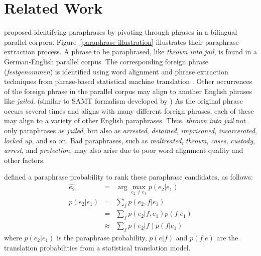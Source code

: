 \documentclass[11pt]{article}
\begin{document}
\section{Related Work}

  proposed identifying paraphrases by pivoting through phrases in a bilingual parallel corpora. 
Figure~\ref{paraphrase-illustration} illustrates their paraphrase extraction process. A phrase to be paraphrased, like {\it thrown into jail}, is found in a German-English parallel corpus.  The corresponding foreign phrase ({\it festgenommen}) is identified using word alignment and phrase extraction techniques from phrase-based statistical machine translation \cite{KoehnEtAl03}.  Other occurrences of the foreign phrase in the parallel corpus may align to another English phrases like {\it jailed}.  (similar to SAMT formalism developed by  )%
%
As the original phrase occurs several times and aligns with many different foreign phrases, each of these may align to a variety of other English paraphrases.  Thus, {\it thrown into jail} not only paraphrases as {\it jailed}, but also as {\it arrested}, {\it detained}, {\it imprisoned}, {\it incarcerated}, {\it locked up}, and so on.
Bad paraphrases, such as
 {\it maltreated}, {\it thrown}, {\it cases}, {\it custody}, {\it arrest}, and {\it protection}, may also arise due to poor word alignment quality and other factors.

 defined a paraphrase probability to rank these paraphrase candidates,  as follows:
\begin{eqnarray} \label{paraphrase-prob-1}
 \hat{e_2}	& = & \arg \max_{e_2 \neq e_1} p(e_2 | e_1)\label{paraphrase-prob}  \\
  p(e_2|e_1) &=& \sum_f p(e_2,f|e_1)\\
                  &=& \sum_f p(e_2|f,e_1) p(f|e_1) \\
                  &\approx& \sum_f p(e_2|f) p(f|e_1)
\label{paraphrase_prob_eqn}
\end{eqnarray}
where ${p(e_2|e_1)}$ is the paraphrase probability, ${p(e|f)}$ and ${p(f|e)}$ are the translation probabilities from a statistical translation model.  
\end{document}
